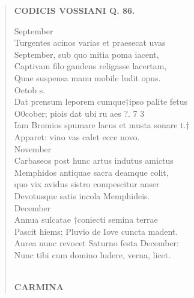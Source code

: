 \documentclass[11pt, a4paper]{report}
\begin{document}
\begin{verse}
    \begin{center} \textbf{CODICIS VOSSIANI Q. 86.} \end{center} \marginpar{[311]} September \\ Turgentes acinos varias et praesecat uvas \\ September, sub quo mitia poma iacent, \\ Captivam filo gandens religasse lacertam, \\ Quae suspensa manu mobile ludit opus. \\ Oetob s. \\ Dat prensum leporem cumque†ipso palite fetus \\ O0cober; piois dat ubi ru aes ?. 7 3 \\ Iam Bromios spumare lacus et musta sonare t.† \\ Apparet: vino vas calet ecce novo. \\ November \\ Carbaseos post hunc artus indutus amictus \\ Memphidos antiquae sacra deamque colit, \\ quo vix avidus sistro compescitur anser \\ Devotusque satis incola Memphideis. \\ December \\ Annua sulcatae †coniecti semina terrae \\ Pascit hiems; Pluvio de Iove cuncta madent. \\ Aurea nunc revocet Saturno festa December: \\ Nunc tibi cum domino ludere, verna, licet. \\ 
        ﻿\pagebreak 
    \begin{center} \textbf{CARMINA} \end{center} \marginpar{[312]} 
      \end{verse}
  
\end{document}
